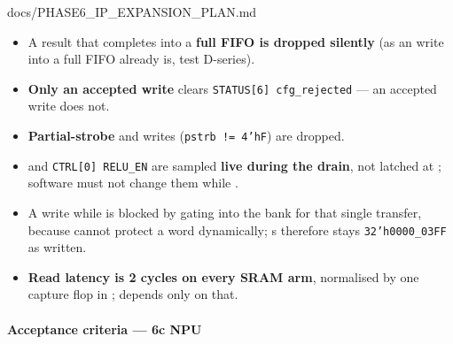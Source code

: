 \begin{relocated}{docs/PHASE6_IP_EXPANSION_PLAN.md}
\begin{itemize}
\tightlist
\item
  A result that completes into a \textbf{full  FIFO is
  dropped silently} (as an  write into a full FIFO already is,
  test D-series).
\item
  \textbf{Only an accepted  write} clears
  \texttt{STATUS[6]\ cfg\_\allowbreak{}rejected} --- an accepted
   write does not.
\item
  \textbf{Partial-strobe}  and  writes
  (\texttt{pstrb\ !=\allowbreak{}\ 4'hF}) are dropped.
\item
   and \texttt{CTRL[0]\ RELU\_\allowbreak{}EN} are sampled
  \textbf{live during the drain}, not latched at ; software
  must not change them while .
\item
  A  write while  is blocked by gating
   into the bank for that single transfer, because
   cannot protect a word dynamically;
  \textquotesingle s  therefore stays
  \texttt{32'h0000\_\allowbreak{}03FF} as written.
\item
  \textbf{Read latency is 2 cycles on every SRAM arm}, normalised by one
  capture flop in ;  depends only
  on that.
\end{itemize}

\paragraph{Acceptance criteria --- 6c NPU}\label{ds:ch:phase6-ip-expansion-plan:acceptance-criteria-6c-npu}


\end{relocated}
